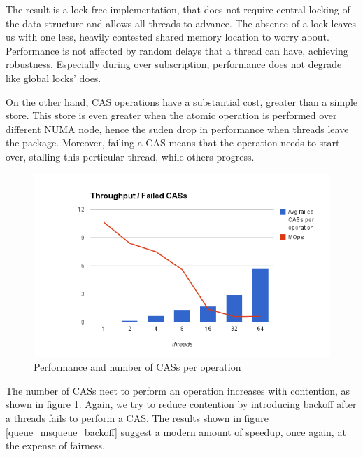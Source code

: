 The result is a lock-free implementation,  that does not require central locking of the data structure and allows all threads to advance. The absence of a lock leaves us with one less, heavily contested shared memory location to worry about. Performance is not affected by random delays that a thread can have, achieving robustness. Especially during over subscription, performance does not degrade like global locks' does.

On the other hand, CAS operations have a substantial cost, greater than a simple store. This store is even greater when the atomic operation is performed over different NUMA node, hence the suden drop in performance when threads leave the package. Moreover, failing a CAS means that the operation needs to start over, stalling this perticular thread, while others progress.  

\begin{figure}
 \centering
  \includegraphics[scale=0.7]{queue_msqueue_CAS_contention.png}
 \caption{ Performance and number of CASs per operation}
\label{queue_msqueue_CAS_contention}
\end{figure}

The number of CASs neet to perform an operation increases with contention, as shown in figure \ref{queue_msqueue_CAS_contention}. Again, we try to reduce contention by introducing backoff after a threads fails to perform a CAS. The results shown in figure \ref{queue_msqueue_backoff} suggest a modern amount of speedup, once again, at the expense of fairness. 

